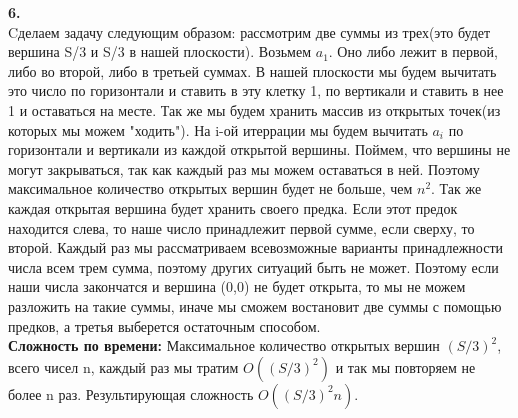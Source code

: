\documentclass[a4paper,12pt]{article}
\begin{document}
\textbf{6.}\\
Cделаем задачу следующим образом: рассмотрим две суммы из трех(это будет вершина S/3 и S/3 в нашей плоскости). Возьмем $a_1$. Оно либо лежит в первой, либо во второй, либо в третьей суммах. В нашей плоскости мы будем вычитать это число по горизонтали и ставить в эту клетку 1, по вертикали и ставить в нее 1 и оставаться на месте. Так же мы будем хранить массив из открытых точек(из которых мы можем "ходить"). На i-ой итеррации мы будем вычитать $a_i$ по горизонтали и вертикали из каждой открытой вершины. Поймем, что вершины не могут закрываться, так как каждый раз мы можем оставаться в ней. Поэтому максимальное количество открытых вершин будет не больше, чем $n^2$.  Так же каждая открытая вершина будет хранить своего предка. Если этот предок находится слева, то наше число принадлежит первой сумме, если сверху, то второй. Каждый раз мы рассматриваем всевозможные варианты принадлежности числа всем трем сумма, поэтому других ситуаций быть не может. Поэтому если наши числа закончатся и вершина (0,0) не будет открыта, то мы не можем разложить на такие суммы, иначе мы сможем востановит две суммы с помощью предков, а третья выберется остаточным способом.\\
\textbf{Сложность по времени:} Максимальное количество открытых вершин $(S/3)^2$, всего чисел n, каждый раз мы тратим  $O((S/3)^2)$ и так мы повторяем не более n раз. Результирующая сложность $O((S/3)^2n)$.
\end{document}
